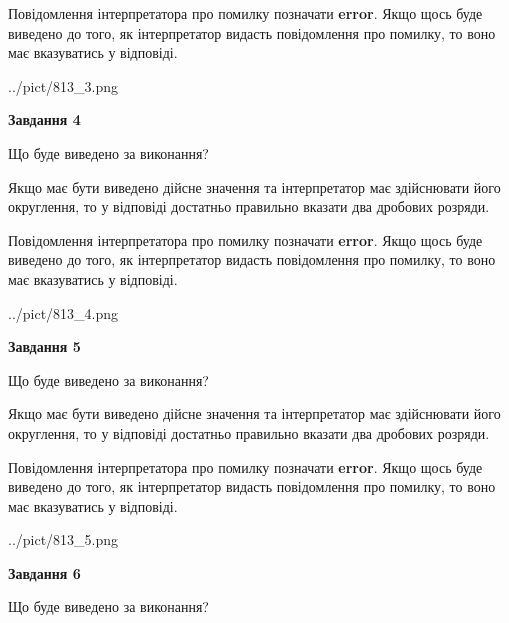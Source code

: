 \documentclass[12pt, ukrainian]{article}
\begin{document}
{\begin {Large}
Повідомлення інтерпретатора про помилку позначати \textbf{error}.
Якщо щось буде виведено до того, як інтерпретатор видасть повідомлення про помилку, 
то воно має вказуватись у відповіді. \par

\begin{center}
	{../pict/813_3.png}
\end{center}
\newpage

{\begin {center}\textbf{Завдання 4}\end {center}}\par
Що буде виведено за виконання? \par

Якщо має бути виведено дійсне значення та інтерпретатор має здійснювати його округлення, 
то у відповіді достатньо правильно вказати два дробових розряди.

Повідомлення інтерпретатора про помилку позначати \textbf{error}.
Якщо щось буде виведено до того, як інтерпретатор видасть повідомлення про помилку, 
то воно має вказуватись у відповіді. \par

\begin{center}
	{../pict/813_4.png}
\end{center}
\newpage

{\begin {center}\textbf{Завдання 5}\end {center}}\par
Що буде виведено за виконання? \par

Якщо має бути виведено дійсне значення та інтерпретатор має здійснювати його округлення, 
то у відповіді достатньо правильно вказати два дробових розряди.

Повідомлення інтерпретатора про помилку позначати \textbf{error}.
Якщо щось буде виведено до того, як інтерпретатор видасть повідомлення про помилку, 
то воно має вказуватись у відповіді. \par

\begin{center}
	{../pict/813_5.png}
\end{center}
\newpage

{\begin {center}\textbf{Завдання 6}\end {center}}\par
Що буде виведено за виконання? \par


\end{Large}}
\end{document}

